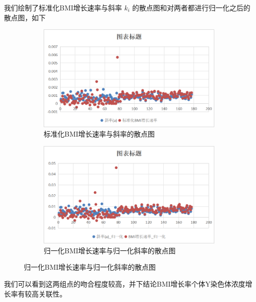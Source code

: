 \documentclass{article}
\begin{document}
我们绘制了标准化BMI增长速率与斜率 $k_i$ 的散点图和对两者都进行归一化之后的散点图，如下
\begin{figure}[H]
    \centering
    \begin{subfigure}[b]{0.45\textwidth}  %
        \centering
        \includegraphics[width=\textwidth]{graph/biaozhunhua.png}  %
        \caption{标准化BMI增长速率与斜率的散点图}  %
        \label{fig:sub1}  %
    \end{subfigure}
    \hspace{0.05\textwidth}  %
    \begin{subfigure}[b]{0.45\textwidth}
        \centering
        \includegraphics[width=\textwidth]{graph/guiyihua.png}
        \caption{归一化BMI增长速率与归一化斜率的散点图}
        \label{fig:sub2}
    \end{subfigure}
    \label{fig:two}  %
\end{figure}
我们可以看到这两组点的吻合程度较高，并下结论BMI增长率个体Y染色体浓度增长率有较高关联性。
\end{document}
